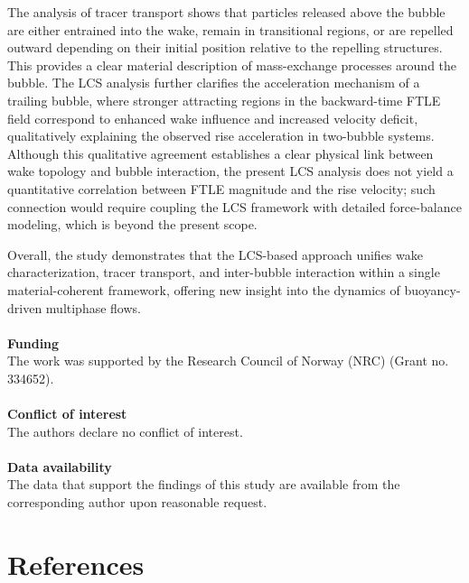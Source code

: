 \documentclass[aps,prfluids,reprint,nofootinbib,onecolumn,groupedaddress,showkeys]{revtex4-2}
\begin{document}
	The analysis of tracer transport shows that particles released above the bubble are either entrained into the wake, remain in transitional regions, or are repelled outward depending on their initial position relative to the repelling structures. This provides a clear material description of mass-exchange processes around the bubble. The LCS analysis further clarifies the acceleration mechanism of a trailing bubble, where stronger attracting regions in the backward-time FTLE field correspond to enhanced wake influence and increased velocity deficit, qualitatively explaining the observed rise acceleration in two-bubble systems. Although this qualitative agreement establishes a clear physical link between wake topology and bubble interaction, the present LCS analysis does not yield a quantitative correlation between FTLE magnitude and the rise velocity; such connection would require coupling the LCS framework with detailed force-balance modeling, which is beyond the present scope.
	
	Overall, the study demonstrates that the LCS-based approach unifies wake characterization, tracer transport, and inter-bubble interaction within a single material-coherent framework, offering new insight into the dynamics of buoyancy-driven multiphase flows.
	\\
	\\
	{\noindent \bf{Funding}} \\	
	The work was supported by the Research Council of Norway (NRC) (Grant no. 334652). \\
	\\
	{\bf{Conflict of interest}} \\
	The authors declare no conflict of interest. \\
	\\
	{\bf{Data availability}} \\
	The data that support the findings of this study are available from the corresponding author upon reasonable request. \\
	
	\nolinenumbers %
	
	\section*{References}
	
	
	
\end{document}
